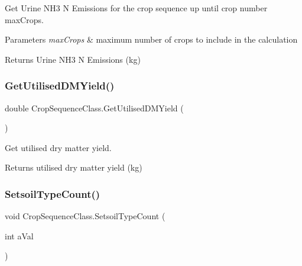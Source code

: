 Get Urine N\+H3 N Emissions for the crop sequence up until crop number max\+Crops. 


\begin{DoxyParams}{Parameters}
{\em max\+Crops} & maximum number of crops to include in the calculation \\
\hline
\end{DoxyParams}
\begin{DoxyReturn}{Returns}
Urine N\+H3 N Emissions (kg) 
\end{DoxyReturn}
\mbox{\label{class_crop_sequence_class_a837331c0bae96fccef99bc094943c818}} 
\subsubsection{\texorpdfstring{GetUtilisedDMYield()}{GetUtilisedDMYield()}}
{\footnotesize\ttfamily double Crop\+Sequence\+Class.\+Get\+Utilised\+D\+M\+Yield (\begin{DoxyParamCaption}{ }\end{DoxyParamCaption})\hspace{0.3cm}{\ttfamily [inline]}}



Get utilised dry matter yield. 

\begin{DoxyReturn}{Returns}
utilised dry matter yield (kg) 
\end{DoxyReturn}
\mbox{\label{class_crop_sequence_class_ab592462fb7000ed8275da763baa9d7d8}} 
\subsubsection{\texorpdfstring{SetsoilTypeCount()}{SetsoilTypeCount()}}
{\footnotesize\ttfamily void Crop\+Sequence\+Class.\+Setsoil\+Type\+Count (\begin{DoxyParamCaption}\item[{int}]{a\+Val }\end{DoxyParamCaption})\hspace{0.3cm}{\ttfamily [inline]}}



